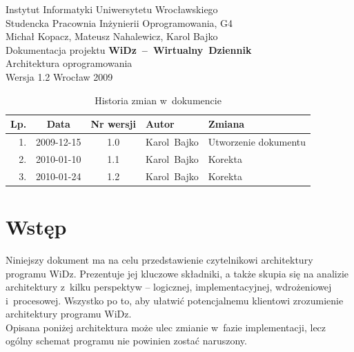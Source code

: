\documentclass[12pt,leqno,twoside]{mwart}
\begin{document}
\begin{titlepage}
\begin{center}
Instytut Informatyki Uniwersytetu Wrocławskiego \\
Studencka Pracownia Inżynierii Oprogramowania, G4 \\
\vspace{4cm}
\Large Michał Kopacz, Mateusz Nahalewicz, Karol Bajko \\
\vspace{0.5cm}
\huge Dokumentacja projektu \mbox{\textbf{WiDz -- Wirtualny Dziennik}} \\ \Large Architektura oprogramowania\\
\vspace{1cm}
\normalsize Wersja 1.2
\vfill
\normalsize Wrocław 2009
\end{center}
\end{titlepage}

\newpage
\vfill
\renewcommand*{\tablename}{Tabela}
\begin{table}
	\centering
	\caption{Historia zmian w~dokumencie}
		\begin{tabular}{|r|c|c|p{}|l|}
		\hline
		Lp. 	& Data       & Nr wersji 	& Autor           		& Zmiana \\ \hline
		1.   	& 2009-12-15 & 1.0       	& \mbox{Karol Bajko} & Utworzenie dokumentu \\ \hline
		2.   	& 2010-01-10 & 1.1       	& \mbox{Karol Bajko} & Korekta \\ \hline
		3.   	& 2010-01-24 & 1.2       	& \mbox{Karol Bajko} & Korekta \\ \hline
		\end{tabular}
\end{table}

\tableofcontents
\newpage

\section{Wstęp}
\noindent Niniejszy dokument ma na celu przedstawienie czytelnikowi architektury programu WiDz. Prezentuje jej kluczowe składniki, a także skupia się na analizie architektury z~kilku perspektyw -- logicznej, implementacyjnej, wdrożeniowej i~procesowej. Wszystko po to, aby ułatwić potencjalnemu klientowi zrozumienie architektury programu WiDz.\\
\indent Opisana poniżej architektura może ulec zmianie w~fazie implementacji, lecz ogólny schemat programu nie powinien zostać naruszony.
\end{document}
